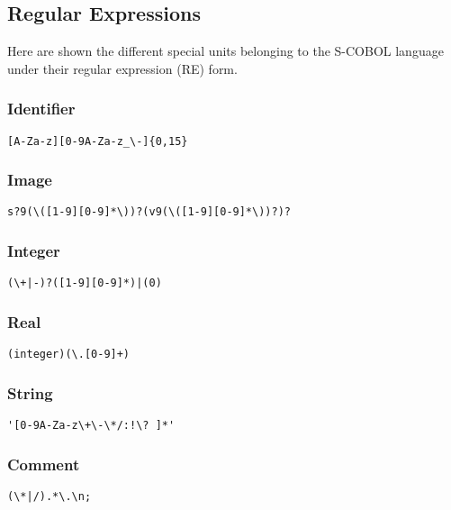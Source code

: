 \subsection{Regular Expressions}


Here are shown the different special units belonging to the S-COBOL language under their regular expression (RE) form.

\subsubsection{Identifier}

\begin{verbatim}
[A-Za-z][0-9A-Za-z_\-]{0,15}
\end{verbatim}


\subsubsection{Image}

\begin{verbatim}
s?9(\([1-9][0-9]*\))?(v9(\([1-9][0-9]*\))?)?
\end{verbatim}


\subsubsection{Integer}

\begin{verbatim}
(\+|-)?([1-9][0-9]*)|(0)
\end{verbatim}


\subsubsection{Real}

\begin{verbatim}
(integer)(\.[0-9]+)
\end{verbatim}


\subsubsection{String}

\begin{verbatim}
'[0-9A-Za-z\+\-\*/:!\? ]*'
\end{verbatim}


\subsubsection{Comment}

\begin{verbatim}
(\*|/).*\.\n;
\end{verbatim}